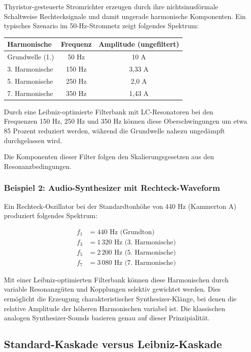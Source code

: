 \documentclass[a4paper, 12pt, twoside, openright]{report}
\theoremstyle{definition}
\theoremstyle{definition}
\begin{document}
Thyristor-gesteuerte Stromrichter erzeugen durch ihre nichtsinusförmale Schaltweise Rechtecksignale und damit ungerade harmonische Komponenten. Ein typisches Szenario im 50-Hz-Stromnetz zeigt folgendes Spektrum:

\begin{center}
\begin{tabular}{l|c|c}
Harmonische & Frequenz & Amplitude (ungefiltert) \\
\hline
Grundwelle (1.) & 50 Hz & 10 A \\
3. Harmonische & 150 Hz & 3,33 A \\
5. Harmonische & 250 Hz & 2,0 A \\
7. Harmonische & 350 Hz & 1,43 A
\end{tabular}
\end{center}

Durch eine Leibniz-optimierte Filterbank mit LC-Resonatoren bei den Frequenzen 150 Hz, 250 Hz und 350 Hz können diese Oberschwingungen um etwa 85 Prozent reduziert werden, während die Grundwelle nahezu ungedämpft durchgelassen wird.

Die Komponenten dieser Filter folgen den Skalierungsgesetzen aus den Resonanzbedingungen.

\subsubsection*{Beispiel 2: Audio-Synthesizer mit Rechteck-Waveform}

Ein Rechteck-Oszillator bei der Standardtonhöhe von 440 Hz (Kammerton A) produziert folgendes Spektrum:

\begin{align}
	f_1 &= 440 \text{ Hz (Grundton)} \\
	f_3 &= 1\,320 \text{ Hz (3. Harmonische)} \\
	f_5 &= 2\,200 \text{ Hz (5. Harmonische)} \\
	f_7 &= 3\,080 \text{ Hz (7. Harmonische)}
\end{align}

Mit einer Leibniz-optimierten Filterbank können diese Harmonischen durch variable Resonanzgüten und Kopplungen selektiv gewichtet werden. Dies ermöglicht die Erzeugung charakteristischer Synthesizer-Klänge, bei denen die relative Amplitude der höheren Harmonischen variabel ist. Die klassischen analogen Synthesizer-Sounds basieren genau auf dieser Prinzipialität.

\subsection{Standard-Kaskade versus Leibniz-Kaskade}
\end{document}
